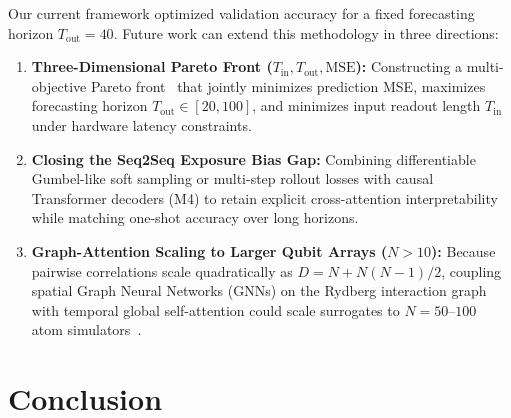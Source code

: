 \documentclass[10pt,a4paper]{article}
\begin{document}
Our current framework optimized validation accuracy for a fixed forecasting horizon $T_{\text{out}} = 40$. Future work can extend this methodology in three directions:
\begin{enumerate}[leftmargin=*, itemsep=1.5pt, topsep=2pt]
    \item \textbf{Three-Dimensional Pareto Front ($T_{\text{in}}, T_{\text{out}}, \text{MSE}$):} Constructing a multi-objective Pareto front~\cite{deb2002} that jointly minimizes prediction MSE, maximizes forecasting horizon $T_{\text{out}} \in [20, 100]$, and minimizes input readout length $T_{\text{in}}$ under hardware latency constraints.
    \item \textbf{Closing the Seq2Seq Exposure Bias Gap:} Combining differentiable Gumbel-like soft sampling or multi-step rollout losses with causal Transformer decoders (M4) to retain explicit cross-attention interpretability while matching one-shot accuracy over long horizons.
    \item \textbf{Graph-Attention Scaling to Larger Qubit Arrays ($N > 10$):} Because pairwise correlations scale quadratically as $D = N + N(N-1)/2$, coupling spatial Graph Neural Networks (GNNs) on the Rydberg interaction graph with temporal global self-attention could scale surrogates to $N = 50\text{--}100$ atom simulators~\cite{bernien2017}.
\end{enumerate}

\section{Conclusion}
\end{document}
